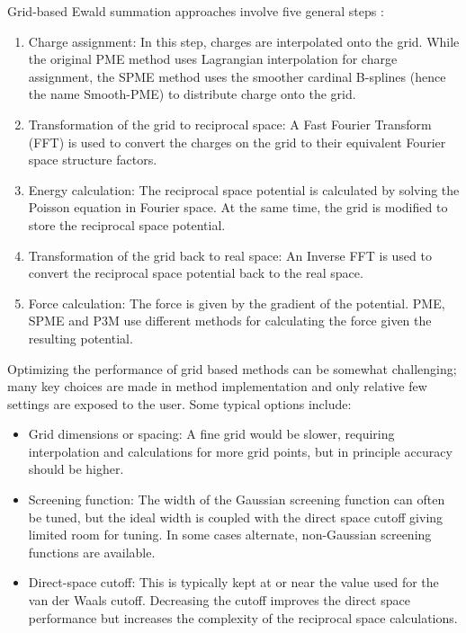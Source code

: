 \documentclass[9pt,bestpractices]{livecoms}
\begin{document}
Grid-based Ewald summation approaches involve five general steps :
\begin{enumerate}
\item Charge assignment: In this step, charges are interpolated onto the grid.
While the original PME method uses Lagrangian interpolation for charge assignment, the SPME method uses the smoother cardinal B-splines (hence the name Smooth-PME) to distribute charge onto the grid. 

\item Transformation of the grid to reciprocal space: A Fast Fourier Transform (FFT) is used to convert the charges on the grid to their equivalent Fourier space structure factors.

\item Energy calculation: The reciprocal space potential is calculated by solving the Poisson equation in Fourier space. At the same time, the grid is modified to store the reciprocal space potential. 


\item Transformation of the grid back to real space: An Inverse FFT is used to convert the reciprocal space potential back to the real space. 
\item Force calculation: The force is given by the gradient of the potential.
PME, SPME and P3M use different methods for calculating the force given the resulting potential. 
\end{enumerate}


Optimizing the performance of grid based methods can be somewhat challenging; many key choices are made in method implementation and only relative few settings are exposed to the user.
Some typical options include: 
 
\begin{itemize}
\item Grid dimensions or spacing: A fine grid would be slower, requiring interpolation and calculations for more grid points, but in principle accuracy should be higher.
\item Screening function: The width of the Gaussian screening function can often be tuned, but the ideal width is coupled with the direct space cutoff giving limited room for tuning. In some cases alternate, non-Gaussian screening functions are available.
\item Direct-space cutoff: This is typically kept at or near the value used for the van der Waals cutoff.
Decreasing the cutoff improves the direct space performance but increases the complexity of the reciprocal space calculations. 
\end{itemize}
\end{document}

